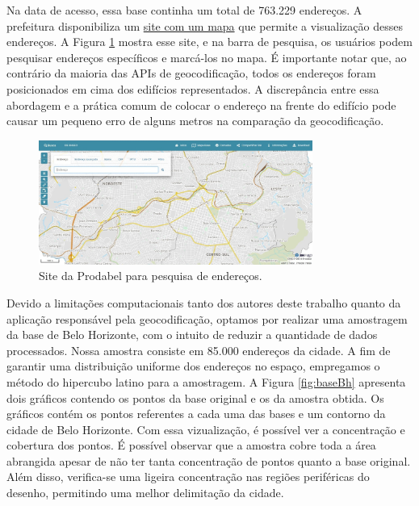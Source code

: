 Na data de acesso, essa base continha um total de 763.229 endereços. A prefeitura disponibiliza um \href{https://bhmap.pbh.gov.br}{site com um mapa} que permite a visualização desses endereços. A Figura \ref{fig:siteProdabel} mostra esse site, e na barra de pesquisa, os usuários podem pesquisar endereços específicos e marcá-los no mapa. É importante notar que, ao contrário da maioria das APIs de geocodificação, todos os endereços foram posicionados em cima dos edifícios representados. A discrepância entre essa abordagem e a prática comum de colocar o endereço na frente do edifício pode causar um pequeno erro de alguns metros na comparação da geocodificação.

\begin{figure}
    \centering
    \includegraphics[width=0.8\textwidth]{Figuras/siteProdabel.jpeg}
    \caption{Site da Prodabel para pesquisa de endereços. }
    \label{fig:siteProdabel}
\end{figure}

Devido a limitações computacionais tanto dos autores deste trabalho quanto da aplicação responsável pela geocodificação, optamos por realizar uma amostragem da base de Belo Horizonte, com o intuito de reduzir a quantidade de dados processados. Nossa amostra consiste em 85.000 endereços da cidade. A fim de garantir uma distribuição uniforme dos endereços no espaço, empregamos o método do hipercubo latino para a amostragem. A Figura \ref{fig:baseBh} apresenta dois gráficos contendo os pontos da base original e os da amostra obtida. Os gráficos contém os pontos referentes a cada uma das bases e um contorno da cidade de Belo Horizonte. Com essa vizualização, é possível ver a concentração e cobertura dos pontos. É possível observar que a amostra cobre toda a área abrangida apesar de não ter tanta concentração de pontos quanto a base original. Além disso, verifica-se uma ligeira concentração nas regiões periféricas do desenho, permitindo uma melhor delimitação da cidade.

